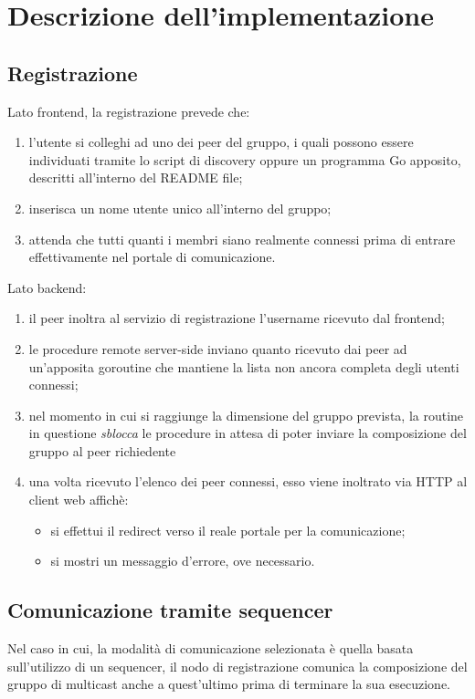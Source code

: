 \documentclass[conference]{IEEEtran}
\begin{document}
\section{Descrizione dell'implementazione}
\subsection{Registrazione}
Lato frontend, la registrazione prevede che:
\begin{enumerate}
\item l'utente si colleghi ad uno dei peer del gruppo, i quali possono essere individuati tramite lo script di discovery oppure un programma Go apposito, descritti all'interno del README file;
\item inserisca un nome utente unico all'interno del gruppo;
\item attenda che tutti quanti i membri siano realmente connessi prima di entrare effettivamente nel portale di comunicazione.
\end{enumerate}

Lato backend:
\begin{enumerate}
\item il peer inoltra al servizio di registrazione l'username ricevuto dal frontend;
\item le procedure remote server-side inviano quanto ricevuto dai peer ad un'apposita goroutine che mantiene la lista non ancora completa degli utenti connessi;
\item nel momento in cui si raggiunge la dimensione del gruppo prevista, la routine in questione \textit{sblocca} le procedure in attesa di poter inviare la composizione del gruppo al peer richiedente
\item una volta ricevuto l'elenco dei peer connessi, esso viene inoltrato via HTTP al client web affichè:
\begin{itemize}
\item si effettui il redirect verso il reale portale per la comunicazione;
\item si mostri un messaggio d'errore, ove necessario.
\end{itemize}
\end{enumerate}

\subsection{Comunicazione tramite sequencer}
Nel caso in cui, la modalità di comunicazione selezionata è quella basata sull'utilizzo di un sequencer, il nodo di registrazione comunica la composizione del gruppo di multicast anche a quest'ultimo prima di terminare la sua esecuzione.
\end{document}

